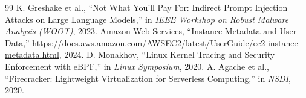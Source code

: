 \documentclass[11pt,a4paper]{article}
\begin{document}
\begin{thebibliography}{99}
 K. Greshake et al., ``Not What You'll Pay For: Indirect Prompt Injection Attacks on Large Language Models,'' in \emph{IEEE Workshop on Robust Malware Analysis (WOOT)}, 2023.
 Amazon Web Services, ``Instance Metadata and User Data,'' \url{https://docs.aws.amazon.com/AWSEC2/latest/UserGuide/ec2-instance-metadata.html}, 2024.
 D. Monakhov, ``Linux Kernel Tracing and Security Enforcement with eBPF,'' in \emph{Linux Symposium}, 2020.
 A. Agache et al., ``Firecracker: Lightweight Virtualization for Serverless Computing,'' in \emph{NSDI}, 2020.
\end{thebibliography}
\end{document}
